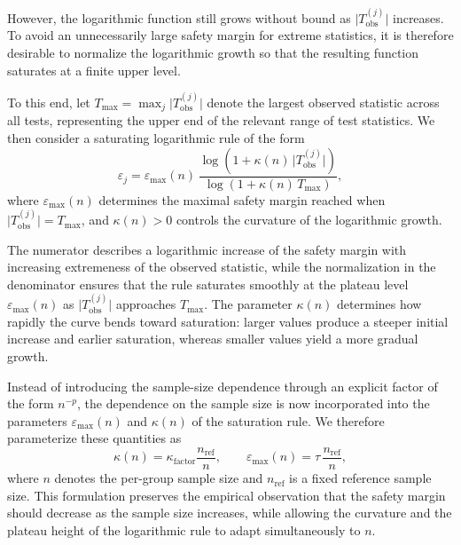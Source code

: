 However, the logarithmic function still grows without bound as $\lvert T_{\mathrm{obs}}^{(j)} \rvert$ increases. 
To avoid an unnecessarily large safety margin for extreme statistics, it is therefore desirable to normalize the logarithmic growth so that the resulting function saturates at a finite upper level.

To this end, let $T_{\max}=\max_j \big|T_{\mathrm{obs}}^{(j)}\big|$ denote the largest observed statistic across all tests, representing the upper end of the relevant range of test statistics. 
We then consider a saturating logarithmic rule of the form
\begin{equation}
\varepsilon_j =
\varepsilon_{\max}(n)\,
\frac{\log\!\left(1 + \kappa(n)\,\big|T_{\mathrm{obs}}^{(j)}\big|\right)}
     {\log\!\left(1 + \kappa(n)\,T_{\max}\right)} ,
\label{eq:eps_log_sat}
\end{equation}
where $\varepsilon_{\max}(n)$ determines the maximal safety margin reached when $\lvert T_{\mathrm{obs}}^{(j)} \rvert = T_{\max}$, and $\kappa(n)>0$ controls the curvature of the logarithmic growth.

The numerator describes a logarithmic increase of the safety margin with increasing extremeness of the observed statistic, while the normalization in the denominator ensures that the rule saturates smoothly at the plateau level $\varepsilon_{\max}(n)$ as $\lvert T_{\mathrm{obs}}^{(j)} \rvert$ approaches $T_{\max}$. 
The parameter $\kappa(n)$ determines how rapidly the curve bends toward saturation: larger values produce a steeper initial increase and earlier saturation, whereas smaller values yield a more gradual growth.

Instead of introducing the sample-size dependence through an explicit factor of the form $n^{-p}$, the dependence on the sample size is now incorporated into the parameters $\varepsilon_{\max}(n)$ and $\kappa(n)$ of the saturation rule. 
We therefore parameterize these quantities as
\begin{equation}
\kappa(n) = \kappa_{\mathrm{factor}}\frac{n_{\mathrm{ref}}}{n},
\qquad
\varepsilon_{\max}(n) = \tau\,\frac{n_{\mathrm{ref}}}{n},
\label{eq:eps_scaling}
\end{equation}
where $n$ denotes the per-group sample size and $n_{\mathrm{ref}}$ is a fixed reference sample size. This formulation preserves the empirical observation that the safety margin should decrease as the sample size increases, while allowing the curvature and the plateau height of the logarithmic rule to adapt simultaneously to $n$.

